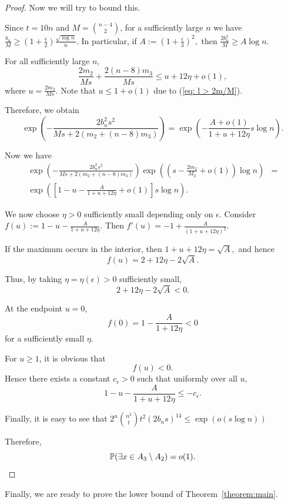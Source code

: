 \documentclass[reqno,11pt]{amsart}
\renewcommand{\leq}{\leqslant}
\renewcommand{\geq}{\geqslant}
\begin{document}
\begin{proof}
Now we will try to bound this. 

Since $t=10n$ and $M=\binom{n-4}{2}$, for a sufficiently large $n$ we have $
\frac{b_n}{M}
\geq
\left(1+\frac{\epsilon}{2}\right)
\frac{\sqrt{\log n}}{n}.
$
In particular, if $
A:=\left(1+\frac{\varepsilon}{3}\right)^2,
$ then $
\frac{2b_n^2}{M}
\geq A\log n.
$

For all sufficiently large $n$, 
$$
\frac{2m_2}{Ms}+ \frac{2(n-8)m_3}{Ms}
\leq
u+12\eta+o(1),
$$
where $u=\frac{2m_2}{Ms}$. Note that $u \leq 1+o(1)$ due to (\ref{eq: l > 2m/M}). 

Therefore, we obtain
$$
\exp\left(-\frac{2b_n^2s^2}{Ms+2(m_2+(n-8)m_3)}\right)
=
\exp\left(-\frac{A+o(1)} {1+u+12\eta}s\log n \right).
$$

Now we have 
\begin{align*}
\exp\left(
-\frac{2b_n^2s^2}
{Ms+2(m_2+(n-8)m_3)}\right)\exp\left( \left(s-\frac{2m_2}{M_2}+o(1) \right)\log n \right) &=\\ 
\exp\left(\left[1-u- \frac{A}{1+u+12\eta} +o(1) \right] s\log n \right).
\end{align*}

We now choose $\eta>0$ sufficiently small depending only on $\epsilon$. Consider $ f(u):= 1-u- \frac{A}{1+u+12\eta}.$ Then $
f'(u) =-1+\frac{A}{(1+u+12\eta)^2}. $

If the maximum occurs in the interior, then $ 1+u+12\eta=\sqrt{A},$ and hence $$
f(u) = 2+12\eta-2\sqrt{A}.
$$

Thus, by taking \(\eta=\eta(\epsilon)>0\) sufficiently small,
$$
2+12\eta-2\sqrt A<0.
$$

At the endpoint \(u=0\),
$$
f(0)= 1-\frac{A}{1+12\eta}<0
$$
for a sufficiently small \(\eta\). 

For $u \geq 1$, it is obvious that $$f(u)<0.$$ Hence there exists a constant $c_\epsilon>0 $ such that uniformly over all \(u\),
$$
1-u-
\frac{A}{1+u+12\eta}
\leq
-c_\epsilon.
$$

Finally, it is easy to see that $2^n\binom{n^2}{t}t^2(2b_ns)^{14} \leq \exp(o(s\log n) )$

Therefore, $$\mathbb{P}(\exists x \in A_3 \setminus A_2) =o(1).\qedhere$$
\end{proof}

Finally, we are ready to prove the lower bound of Theorem~\ref{theorem:main}.
\end{document}
